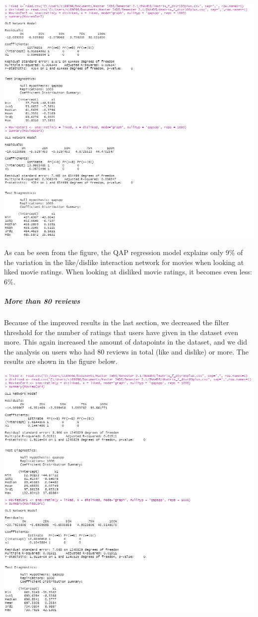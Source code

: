 \documentclass[
  man]{apa6}
\begin{document}
\includegraphics[width=12.06in]{results100plus}

As can be seen from the figure, the QAP regression model explains only
9\% of the variation in the like/dislike interaction network for movies
when looking at liked movie ratings. When looking at disliked movie
ratings, it becomes even less: 6\%.

\hypertarget{more-than-80-reviews}{%
\subparagraph{More than 80 reviews}\label{more-than-80-reviews}}

Because of the improved results in the last section, we decreased the
filter threshold for the number of ratings that users have given in the
dataset even more. This again increased the amount of datapoints in the
dataset, and we did the analysis on users who had 80 reviews in total
(like and dislike) or more. The results are shown in the figure below.

\includegraphics[width=11.78in]{results80plus}
\end{document}
